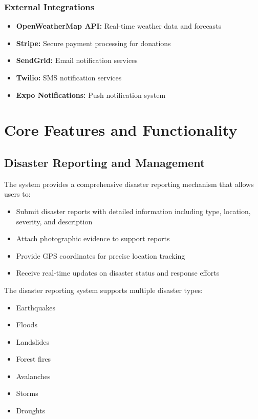 \documentclass[12pt,a4paper]{article}
\begin{document}
\subsubsection{External Integrations}
\begin{itemize}
    \item \textbf{OpenWeatherMap API:} Real-time weather data and forecasts
    \item \textbf{Stripe:} Secure payment processing for donations
    \item \textbf{SendGrid:} Email notification services
    \item \textbf{Twilio:} SMS notification services
    \item \textbf{Expo Notifications:} Push notification system
\end{itemize}

\section{Core Features and Functionality}

\subsection{Disaster Reporting and Management}

The system provides a comprehensive disaster reporting mechanism that allows users to:

\begin{itemize}
    \item Submit disaster reports with detailed information including type, location, severity, and description
    \item Attach photographic evidence to support reports
    \item Provide GPS coordinates for precise location tracking
    \item Receive real-time updates on disaster status and response efforts
\end{itemize}

The disaster reporting system supports multiple disaster types:
\begin{itemize}
    \item Earthquakes
    \item Floods
    \item Landslides
    \item Forest fires
    \item Avalanches
    \item Storms
    \item Droughts
\end{itemize}
\end{document}

